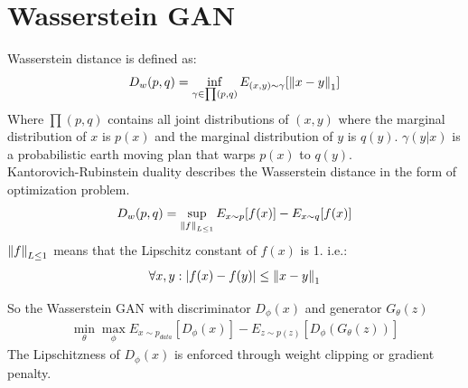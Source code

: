 \section{Wasserstein GAN} 
Wasserstein distance is defined as: 
    \begin{align*}
        D_w(p,q) = \inf_{\gamma \in \prod(p,q)} E_{(x,y) \sim \gamma}[ \left\lVert x-y\right\rVert_1]
    \end{align*}
Where $\prod(p,q)$ contains all joint distributions of $(x,y)$ where the marginal distribution of $x$ is $p(x)$ and the marginal distribution of $y$ is $q(y)$. $\gamma(y|x)$ is a probabilistic earth moving plan that warps $p(x)$ to $q(y)$. \\

Kantorovich-Rubinstein duality describes the Wasserstein distance in the form of optimization problem. 
    \begin{align*}
        D_w(p,q) = \sup_{\left\lVert f\right\rVert_{L\leq 1}} E_{x\sim p}[f(x)] - E_{x\sim q}[f(x)]
    \end{align*}
$\left\lVert f\right\rVert_{L\leq 1}$ means that the Lipschitz constant of $f(x)$ is 1. i.e.: 
    \begin{align*}
        \forall x,y: \left| f(x) - f(y) \right| \leq \left\lVert x-y\right\rVert_1
    \end{align*}
    
So the Wasserstein GAN with discriminator $D_\phi(x)$ and generator $G_\theta(z)$
    \begin{align*}
        \min_\theta \max_\phi E_{x\sim p_{data}}[D_\phi(x)] - E_{z\sim p(z)}[D_\phi(G_\theta(z))]
    \end{align*}
The Lipschitzness of $D_\phi(x)$ is enforced through weight clipping or gradient penalty. 

